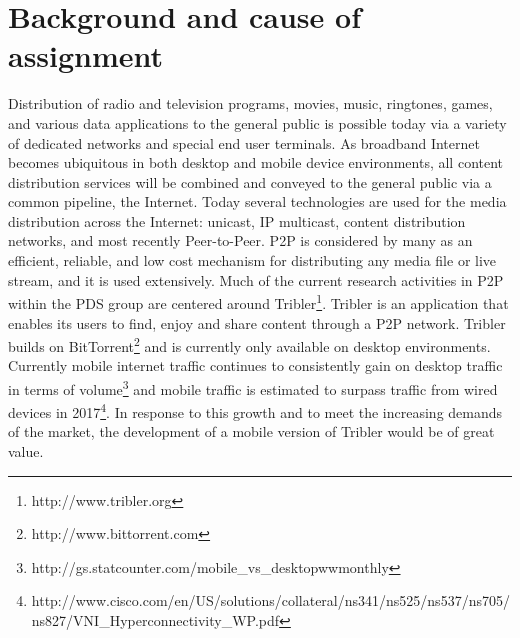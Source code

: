 \section{Background and cause of assignment}
Distribution of radio and television programs, movies, music, ringtones, games, and various data applications to the general public is possible today via a variety of dedicated networks and special end user terminals. As broadband Internet becomes ubiquitous in both desktop and mobile device environments, all content distribution services will be combined and conveyed to the general public via a common pipeline, the Internet. Today several technologies are used for the media distribution across the Internet: unicast, IP multicast, content distribution networks, and most recently Peer-to-Peer. P2P is considered by many as an efficient, reliable, and low cost mechanism for distributing any media file or live stream, and it is used extensively. Much of the current research activities in P2P within the PDS group are centered around Tribler\footnote{http://www.tribler.org}. Tribler is an application that enables its users to find, enjoy and share content through a P2P network. Tribler builds on BitTorrent\footnote{http://www.bittorrent.com} and is currently only available on desktop environments. Currently mobile internet traffic continues to consistently gain on desktop traffic in terms of volume\footnote{http://gs.statcounter.com/mobile\_vs\_desktop\-ww\-monthly} and mobile traffic is estimated to surpass traffic from wired devices in 2017\footnote{http://www.cisco.com/en/US/solutions/collateral/ns341/ns525/ns537/ns705/ns827/VNI\_Hyperconnectivity\_WP.pdf}. In response to this growth and to meet the increasing demands of the market, the development of a mobile version of Tribler would be of great value. 
